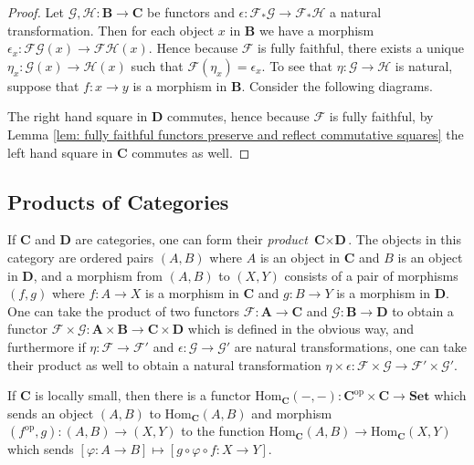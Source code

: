 \documentclass[oneside,11pt]{amsart}
\newcommand{\bA}{\ensuremath{\textbf{A}}}
\newcommand{\bB}{\ensuremath{\textbf{B}}}
\newcommand{\bC}{\ensuremath{\textbf{C}}}
\newcommand{\bD}{\ensuremath{\textbf{D}}}
\newcommand{\bSet}{\ensuremath{\textbf{Set}}}
\newcommand{\mF}{\ensuremath{\mathcal{F}}}
\newcommand{\mG}{\ensuremath{\mathcal{G}}}
\newcommand{\mH}{\ensuremath{\mathcal{H}}}
\newcommand{\Hom}{\ensuremath{\text{Hom}}}
\newcommand{\op}{\ensuremath{\text{op}}}
\theoremstyle{definition}
\newtheorem{proof techniques}{Proof Techniques}
\begin{document}
\begin{proof}
Let $\mG , \mH : \bB \to \bC$ be functors and $\epsilon : \mF_* \mG \to \mF_* \mH$ a natural transformation. Then for each object $x$ in $\bB$ we have a morphism $\epsilon_x : \mF \mG(x) \to \mF \mH(x)$. Hence because $\mF$ is fully faithful, there exists a unique $\eta_x : \mG(x) \to \mH(x)$ such that $\mF(\eta_x) = \epsilon_x$. To see that $\eta : \mG \to \mH$ is natural, suppose that $f : x \to y$ is a morphism in $\bB$. Consider the following diagrams. 
\begin{center}
\end{center}
The right hand square in $\bD$ commutes, hence because $\mF$ is fully faithful, by Lemma \ref{lem: fully faithful functors preserve and reflect commutative squares} the left hand square in $\bC$ commutes as well. 
\end{proof}



\subsection{Products of Categories}

If $\bC$ and $\bD$ are categories, one can form their \emph{product} $\bC \times \bD$. The objects in this category are ordered pairs $(A , B)$ where $A$ is an object in $\bC$ and $B$ is an object in $\bD$, and a morphism from $(A , B)$ to $(X , Y)$ consists of a pair of morphisms $(f , g)$ where $f : A \to X$ is a morphism in $\bC$ and $g  : B \to Y$ is a morphism in $\bD$. One can take the product of two functors $\mF : \bA \to \bC$ and $\mG : \bB \to \bD$ to obtain a functor $\mF \times \mG : \bA \times \bB \to \bC \times \bD$ which is defined in the obvious way, and furthermore if $\eta : \mF \to \mF'$ and $\epsilon : \mG \to \mG'$ are natural transformations, one can take their product as well to obtain a natural transformation $\eta \times \epsilon : \mF \times \mG \to \mF' \times \mG'$. 

If $\bC$ is locally small, then there is a functor $\Hom_\bC(- , -) : \bC^\op \times \bC \to \bSet$ which sends an object $(A , B)$ to $\Hom_\bC(A , B)$ and morphism $(f^\op , g) : (A , B) \to (X , Y)$ to the function $\Hom_\bC(A , B) \to \Hom_\bC(X , Y)$ which sends $[\varphi : A \to B] \mapsto [g \circ \varphi \circ f : X \to Y]$. 
\end{document}
